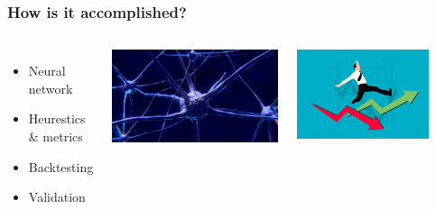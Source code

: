 \begin{frame}
  \frametitle{How is it accomplished?}
  \begin{columns}
    \begin{itemize}
        \item Neural network
        \item Heurestics \& metrics
        \item Backtesting
        \item Validation
    \end{itemize}
     
        \centering
        \includegraphics[width=\textwidth]{img/neuron.jpg}
        
        \bigskip
        \includegraphics[width=0.8\textwidth]{img/risk.png}
  \end{columns}
\end{frame}



